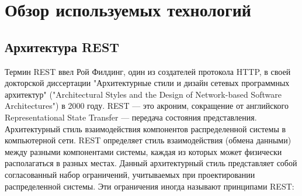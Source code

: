 \section{Обзор используемых технологий}

\subsection{Архитектура REST}
Термин REST ввел Рой Филдинг, один из создателей протокола HTTP, в своей докторской диссертации "Архитектурные стили и дизайн сетевых программных архитектур" ("Architectural Styles and the Design of Network-based Software Architectures") в 2000 году. REST — это акроним, сокращение от английского Representational State Transfer — передача состояния представления. Архитектурный стиль взаимодействия компонентов распределенной системы в компьютерной сети. REST определяет стиль взаимодействия (обмена данными) между разными компонентами системы, каждая из которых может физически располагаться в разных местах.
Данный архитектурный стиль представляет собой согласованный набор ограничений, учитываемых при проектировании распределенной системы. Эти ограничения иногда называют принципами REST:
